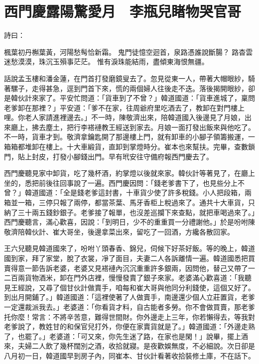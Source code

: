 %

\chapter{西門慶露陽驚愛月　李瓶兒睹物哭官哥}

詩曰：

楓葉初丹槲葉黃，河陽愁髩恰新霜。
鬼門徒憶空迴首，泉路憑誰說斷腸？
路杳雲迷愁漠漠，珠沉玉殞事茫茫。
惟有淚珠能結雨，盡傾東海恨無疆。

話說孟玉樓和潘金蓮，在門首打發磨鏡叟去了。忽見從東一人，帶著大帽眼紗，騎著騾子，走得甚急，逕到門首下來，慌的兩個婦人往後走不迭。落後揭開眼紗，卻是韓伙計來家了。平安忙問道：「貨車到了不曾？」韓道國道：「貨車進城了，稟問老爹卸在那裡？」平安道：「爹不在家，往周爺府里吃酒去了，教卸在對門樓上哩。你老人家請進裡邊去。」不一時，陳敬濟出來，陪韓道國入後邊見了月娘，出來廳上，拂去塵土，把行李褡褳教王經送到家去。月娘一面打發出飯來與他吃了。不一時，貨車才到。敬濟拿鑰匙開了那邊樓上門，就有卸車的小腳子領籌搬運，一箱箱都堆卸在樓上。十大車緞貨，直卸到掌燈時分。崔本也來幫扶。完畢，查數鎖門，貼上封皮，打發小腳錢出門。早有玳安往守備府報西門慶去了。

西門慶聽見家中卸貨，吃了幾杯酒，約掌燈以後就來家。韓伙計等著見了，在廳上坐的，悉把前後往回事說了一遍。西門慶因問：「錢老爹書下了，也見些分上不曾？」韓道國道：「全是錢老爹這封書，十車貨少使了許多稅錢。小人把段箱，兩箱並一箱，三停只報了兩停，都當茶葉、馬牙香柜上稅過來了。通共十大車貨，只納了三十兩五錢鈔銀子。老爹接了報單，也沒差巡攔下來查點，就把車喝過來了。」西門慶聽言，滿心歡喜，因說：「到明日，少不的重重買一分禮謝他。」於是吩咐陳敬濟陪韓伙計、崔大哥坐，後邊拿菜出來，留吃了一回酒，方纔各散回家。

王六兒聽見韓道國來了，吩咐丫頭春香、錦兒，伺候下好茶好飯。等的晚上，韓道國到家，拜了家堂，脫了衣裳，凈了面目，夫妻二人各訴離情一遍。韓道國悉把買賣得意一節告訴老婆，老婆又見褡褳內沉沉重重許多銀兩，因問他，替己又帶了一二百兩貨物酒米，卸在門外店裡，慢慢發賣了銀子來家。老婆滿心歡喜道：「我聽見王經說，又尋了個甘伙計做賣手，咱每和崔大哥與他同分利錢使，這個又好了。到出月開鋪了。」韓道國道：「這裡使著了人做賣手，南邊還少個人立莊置貨，老爹一定還裁派我去。」老婆道：「你看貨才料，自古能者多勞。你不會做買賣，那老爹托你麼！常言：不將辛苦意，難得世間財。你外邊走上三年，你若懶得去，等我對老爹說了，教姓甘的和保官兒打外，你便在家賣貨就是了。」韓道國道：「外邊走熟了，也罷了。」老婆道：「可又來，你先生迷了路，在家也是閑！」說畢，擺上酒來，夫婦二人飲了幾杯闊別之酒，收拾就寢。是夜歡娛無度，不必細說。次日卻是八月初一日，韓道國早到房子內，同崔本、甘伙計看著收拾裝修土庫，不在話下。

